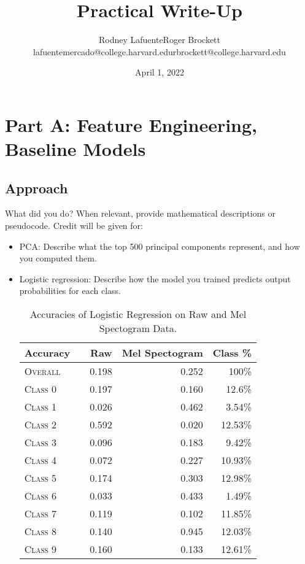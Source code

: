 \documentclass[11pt]{article}
\title{Practical Write-Up}
\author{Rodney Lafuente\hspace{4cm}Roger Brockett \\ 
lafuentemercado@college.harvard.edu\hspace{1cm}rbrockett@college.harvard.edu}
\date{April 1, 2022}
\begin{document}
\maketitle{}

\section{Part A: Feature Engineering, Baseline Models}

\subsection{Approach}

What did you do? When relevant, provide mathematical descriptions or pseudocode. Credit will be given for:

  \begin{itemize}
  \item PCA:  Describe what the top 500 principal components represent, and how you computed them.
  \item Logistic regression: Describe how the model you trained predicts output probabilities for each class.
  \begin{table}[ht]
    \centering
    \begin{tabular}{llrrr}
        \toprule
        Accuracy &  & Raw & Mel Spectogram & Class \% \\
        \midrule
        \textsc{Overall} & & 0.198 & 0.252 & 100\% \\
        \textsc{Class 0} & & 0.197 & 0.160 & 12.6\% \\
        \textsc{Class 1} & & 0.026 & 0.462 & 3.54\% \\
        \textsc{Class 2} & & 0.592 & 0.020 & 12.53\% \\
        \textsc{Class 3} & & 0.096 & 0.183 & 9.42\% \\
        \textsc{Class 4} & & 0.072 & 0.227 & 10.93\% \\
        \textsc{Class 5} & & 0.174 & 0.303 & 12.98\% \\
        \textsc{Class 6} & & 0.033 & 0.433 & 1.49\% \\
        \textsc{Class 7} & & 0.119 & 0.102 & 11.85\% \\
        \textsc{Class 8} & & 0.140 & 0.945 & 12.03\% \\
        \textsc{Class 9} & & 0.160 & 0.133 & 12.61\% \\
        \bottomrule
    \end{tabular}
    \caption{\label{tab:lr_results} Accuracies of Logistic Regression on Raw and Mel Spectogram Data.}
    \end{table}
  \end{itemize}
\end{document}
